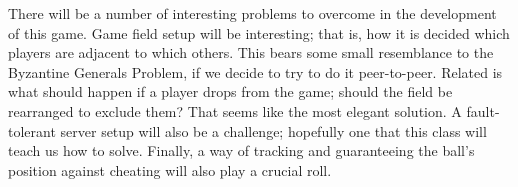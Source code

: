 \documentclass{sig-alternate}
\begin{document}

There will be a number of interesting problems to overcome in the
development of this game.  Game field setup will be interesting; that is,
how it is decided which players are adjacent to which others.  This bears
some small resemblance to the Byzantine Generals Problem, if we decide to
try to do it peer-to-peer.  Related is what should happen if a player drops
from the game; should the field be rearranged to exclude them?  That seems
like the most elegant solution.  A fault-tolerant server setup will also be
a challenge; hopefully one that this class will teach us how to solve.
Finally, a way of tracking and guaranteeing the ball's position against
cheating will also play a crucial roll.







% 
% 
\balance
\end{document}
